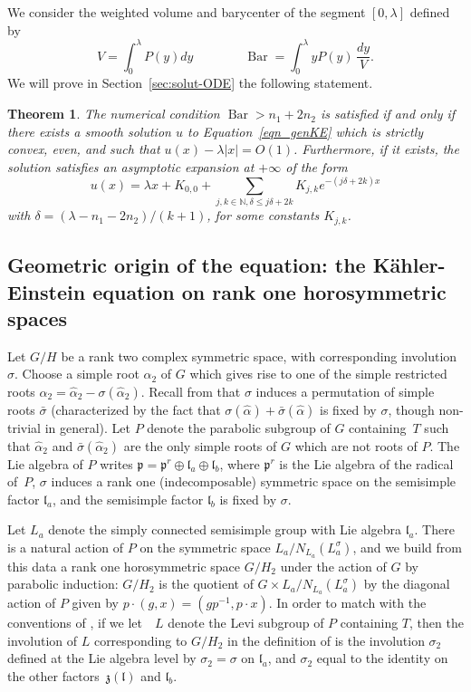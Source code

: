 \documentclass[10pt]{amsart}
\theoremstyle{plain}
\newtheorem{thm}{Theorem}[section]
\theoremstyle{definition}
\DeclareMathOperator{\barDH}{Bar}
\newcommand{\ha}{\hat{\alpha}}
\begin{document}
We consider the weighted volume and barycenter of the segment $[0,\lambda]$ defined by
\[ V=\int_0^{\lambda}P(y)dy \qquad \qquad
\barDH = \int_0^{\lambda} yP(y)\,\frac{dy}{V}. \]
We will prove in Section~\ref{sec:solut-ODE} the following statement.

\begin{thm}
\label{thm:ODE}
The numerical condition $\barDH>n_1+2n_2$ is satisfied if and only if
there exists a smooth solution $u$ to Equation~\eqref{eqn_genKE}
which is strictly convex, even, and such that $u(x)-\lambda|x|=O(1)$.
Furthermore, if it exists, the solution satisfies
an asymptotic expansion at $+\infty$ of the form
\[ u(x)= \lambda x +K_{0,0}+
\sum_{j,k\in \mathbb{N}, \delta\leq j\delta+2k}K_{j,k}e^{-(j\delta+2k)x} \]
with $\delta=(\lambda-n_1-2n_2)/(k+1)$,
for some constants $K_{j,k}$.
\end{thm}

\subsection{Geometric origin of the equation: the Kähler-Einstein equation on rank one horosymmetric spaces}
\label{sec:facets}

Let $G/H$ be a rank two complex symmetric space, with corresponding involution $\sigma$.
Choose a simple root $\ha_2$ of $G$ which gives rise to one of the simple restricted roots
$\alpha_2=\ha_2-\sigma(\ha_2)$.
Recall from \cite{DCP83} that $\sigma$ induces a permutation
of simple roots $\bar{\sigma}$ (characterized by the fact that
$\sigma(\ha)+\bar{\sigma}(\ha)$ is fixed by $\sigma$, though non-trivial in general).
Let $P$ denote the parabolic subgroup of $G$ containing~$T$ such that
$\ha_2$ and $\bar{\sigma}(\ha_2)$ are the only simple roots of $G$ which are not roots
of $P$. The Lie algebra of $P$ writes
$\mathfrak{p}=\mathfrak{p}^r \oplus \mathfrak{l}_a \oplus \mathfrak{l}_b$,
where $\mathfrak{p}^r$ is the Lie algebra of the radical of~$P$,
$\sigma$ induces a rank one (indecomposable) symmetric space on the
semisimple factor $\mathfrak{l}_a$, and the semisimple factor
$\mathfrak{l}_b$ is fixed by $\sigma$.

Let $L_a$ denote the simply connected semisimple group with Lie algebra
$\mathfrak{l}_a$. There is a natural action of $P$ on the symmetric
space $L_a/N_{L_a}(L_a^{\sigma})$, and we build from this data a rank one
horosymmetric space $G/H_2$ under the action of $G$ by parabolic induction:
$G/H_2$ is the quotient of $G\times L_a/N_{L_a}(L_a^{\sigma})$ by the
diagonal action of $P$ given by $p\cdot (g,x)=(gp^{-1},p\cdot x)$.
In order to match with the conventions of \cite{DelHoro},
if we let~ $L$ denote the Levi subgroup of $P$ containing $T$, then the involution
of $L$ corresponding to $G/H_2$ in the definition of \cite{DelHoro} is
the involution $\sigma_2$ defined at the Lie algebra level by $\sigma_2=\sigma$
on $\mathfrak{l}_a$, and $\sigma_2$ equal to the identity on the other factors~$\mathfrak{z}(\mathfrak{l})$ and $\mathfrak{l}_b$.
\end{document}
